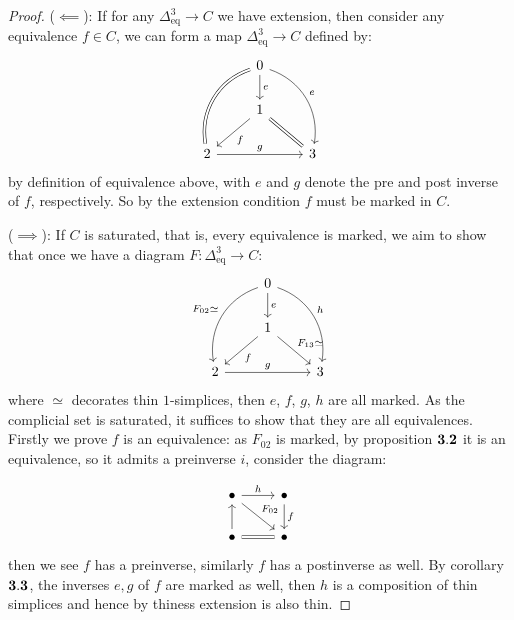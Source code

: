 \documentclass[11pt]{article}
\DeclareMathOperator{\eq}{eq}
\begin{document}
\begin{proof}
	($\impliedby$): If for any $\Delta^3_{\eq}\to C$ we have extension, then consider any equivalence $f\in C$, we can form a map $\Delta^3_{\eq}\to C$ defined by:
	\begin{equation*}
	\begin{tikzcd}[column sep=small, row sep=small]
	& & 0 \arrow{dd}{e}\arrow[equal,swap,bend right=40]{ddddll}{} \arrow[bend left=40]{ddddrr}{e} \\
	\\
	&  & 1\arrow{ddll}{f} \arrow[equal]{ddrr}{} &  \\
	& &  \\
	2 \arrow{rrrr}{g} & & & & 3
	\end{tikzcd}
	\end{equation*}
	by definition of equivalence above, with $e$ and $g$ denote the pre and post inverse of $f$, respectively. So by the extension condition $f$ must be marked in $C$.
	
	($\implies$): If $C$ is saturated, that is, every equivalence is marked, we aim to show that once we have a diagram $F:\Delta^3_{\eq}\to C$:
	\begin{equation*}
	\begin{tikzcd}[column sep=small, row sep=small]
	& & 0 \arrow{dd}{e}\arrow[swap,bend right=40]{ddddll}{F_{02}\simeq} \arrow[bend left=40]{ddddrr}{h} \\
	\\
	&  & 1\arrow{ddll}{f} \arrow{ddrr}{F_{13}\simeq} &  \\
	& &  \\
	2 \arrow{rrrr}{g} & & & & 3
	\end{tikzcd}
	\end{equation*}
	where $\simeq$ decorates thin $1$-simplices, then $e$, $f$, $g$, $h$ are all marked. As the complicial set is saturated, it suffices to show that they are all equivalences.
	Firstly we prove $f$ is an equivalence: as $F_{02}$ is marked, by proposition $\bf 3.2$ it is an equivalence, so it admits a preinverse $i$, consider the diagram:
	
	
	$$\begin{tikzcd}
		\bullet \arrow[r, "h"] \arrow[dr,"F_{02}"]
		&\bullet \arrow[d, "f"] \\
		\bullet \arrow[equal,r] \arrow[u]
		& \bullet
	\end{tikzcd}
	$$
	then we see $f$ has a preinverse, similarly $f$ has a postinverse as well.
	By corollary $\bf 3.3$, the inverses $e,g$ of $f$ are marked as well, then $h$ is a composition of thin simplices and hence by thiness extension is also thin.
	
\end{proof}
\end{document}
